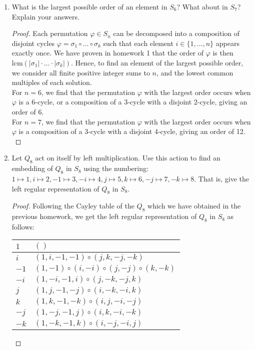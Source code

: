 \documentclass{article}
\begin{document}
\begin{enumerate}
  \item What is the largest possible order of an element in $S_6$? What
    about in $S_7$? Explain your answers. 

    \begin{proof}
      Each permutation $\varphi\in S_n$ can be decomposed into a
      composition of disjoint cycles
      $\varphi=\sigma_1\circ\ldots\circ\sigma_k$ such that each element
      $i\in\{1,\ldots,n\}$ appears exactly once. We have proven in homework
      1 that the order of $\varphi$ is then
      $\mathrm{lcm}(|\sigma_1|\cdot\ldots\cdot|\sigma_k|)$. Hence, to find
      an element of the largest possible order, we consider all finite
      positive integer sums to $n$, and the lowest common multiples of each
      solution. \\

      For $n=6$, we find that the permutation $\varphi$ with the largest
      order occurs when $\varphi$ is a 6-cycle, or a composition of a 3-cycle
      with a disjoint 2-cycle, giving an order of 6. \\

      For $n=7$, we find that the permutation $\varphi$ with the largest
      order occurs when $\varphi$ is a composition of a 3-cycle
      with a disjoint 4-cycle, giving an order of 12. \\
    \end{proof}

  \item Let $Q_8$ act on itself by left multiplication. Use this action to
    find an embedding of $Q_8$ in $S_8$ using the numbering:
    $1\mapsto1,i\mapsto2,-1\mapsto3,-i\mapsto4,j\mapsto5,k\mapsto6,-j\mapsto7,-k\mapsto8$.
    That is, give the left regular representation of $Q_8$ in $S_8$.

    \begin{proof}
      Following the Cayley table of the $Q_8$ which we have obtained in the
      previous homework, we get the left regular representation of $Q_8$ in
      $S_8$ as follows:

      \begin{center}
        \begin{tabular}{|l||l|}
          \hline
          $1$   & $()$ \\ \hline
          $i$   & $(1,i,-1,-1)\circ(j,k,-j,-k)$ \\ \hline
          $-1$  & $(1,-1)\circ(i,-i)\circ(j,-j)\circ(k,-k)$ \\ \hline
          $-i$  & $(1,-i,-1,i)\circ(j,-k,-j,k)$ \\ \hline
          $j$   & $(1,j,-1,-j)\circ(i,-k,-i,k)$ \\ \hline
          $k$   & $(1,k,-1,-k)\circ(i,j,-i,-j)$ \\ \hline
          $-j$  & $(1,-j,-1,j)\circ(i,k,-i,-k)$ \\ \hline
          $-k$  & $(1,-k,-1,k)\circ(i,-j,-i,j)$ \\ \hline
        \end{tabular}
      \end{center}


\end{proof}
\end{enumerate}
\end{document}
